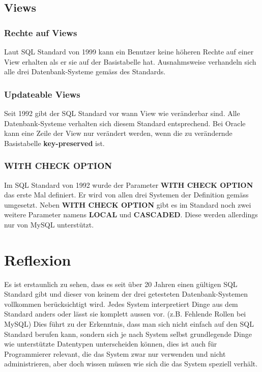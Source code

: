 \documentclass[10pt]{scrreprt}
\newcommand{\Bold}[1]{\textbf{#1}} %
\begin{document}
\subsection{Views}
\subsubsection{Rechte auf Views}
Laut SQL Standard von 1999 kann ein Benutzer keine höheren Rechte auf einer View erhalten als er sie auf der Basistabelle hat. Ausnahmsweise verhandeln sich alle drei Datenbank-Systeme gemäss des Standards.
\subsubsection{Updateable Views}
Seit 1992 gibt der SQL Standard vor wann View wie veränderbar sind. Alle Datenbank-Systeme verhalten sich diesem Standard entsprechend. Bei Oracle kann eine Zeile der View nur verändert werden, wenn die zu verändernde Basistabelle \Bold{key-preserved} ist.
\subsubsection{WITH CHECK OPTION}
Im SQL Standard von 1992 wurde der Parameter \Bold{WITH CHECK OPTION} das erste Mal definiert. Er wird von allen drei Systemen der Definition gemäss umgesetzt. Neben \Bold{WITH CHECK OPTION} gibt es im Standard noch zwei weitere Parameter namens \Bold{LOCAL} und \Bold{CASCADED}. Diese werden allerdings nur von MySQL unterstützt.

\section{Reflexion}
Es ist erstaunlich zu sehen, dass es seit über 20 Jahren einen gültigen SQL Standard gibt und dieser von keinem der drei getesteten Datenbank-Systemen vollkommen berücksichtigt wird. Jedes System interpretiert Dinge aus dem Standard anders oder lässt sie komplett aussen vor. (z.B. Fehlende Rollen bei MySQL)\newline
Dies führt zu der Erkenntnis, dass man sich nicht einfach auf den SQL Standard berufen kann, sondern sich je nach System selbst grundlegende Dinge wie unterstützte Datentypen unterscheiden können, dies ist auch für Programmierer relevant, die das System zwar nur verwenden und nicht administrieren, aber doch wissen müssen wie sich die das System speziell verhält.

\end{document}

